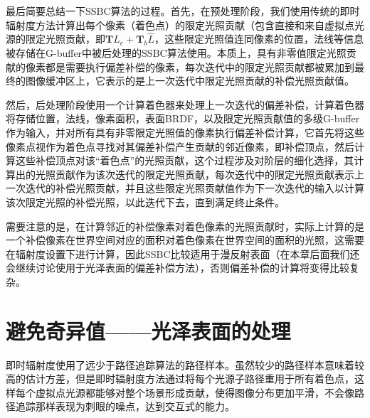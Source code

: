 最后简要总结一下SSBC算法的过程。首先，在预处理阶段，我们使用传统的即时辐射度方法计算出每个像素（着色点）的限定光照贡献（包含直接和来自虚拟点光源的限定光照贡献，即$\mathbf{T}L_e+\mathbf{T}_b\hat{L}$，这些限定光照值连同像素的位置，法线等信息被存储在G-buffer中被后处理的SSBC算法使用。本质上，具有非零值限定光照贡献的像素都是需要执行偏差补偿的像素，每次迭代中的限定光照贡献都被累加到最终的图像缓冲区上，它表示的是上一次迭代中限定光照贡献的补偿光照贡献值。

然后，后处理阶段使用一个计算着色器来处理上一次迭代的偏差补偿，计算着色器将存储位置，法线，像素面积，表面BRDF，以及限定光照贡献值的多级G-buffer作为输入，并对所有具有非零限定光照值的像素执行偏差补偿计算，它首先将这些像素点视作为着色点寻找对其偏差补偿产生贡献的邻近像素，即补偿顶点，然后计算这些补偿顶点对该“着色点”的光照贡献，这个过程涉及对阶层的细化选择，其计算出的光照贡献作为该次迭代的限定光照贡献，每次迭代中的限定光照贡献表示上一次迭代的补偿光照贡献，并且这些限定光照贡献值作为下一次迭代的输入以计算该次限定光照的补偿光照，以此迭代下去，直到满足终止条件。

需要注意的是，在计算邻近的补偿像素对着色像素的光照贡献时，实际上计算的是一个补偿像素在世界空间对应的面积对着色像素在世界空间的面积的光照，这需要在辐射度设置下进行计算，因此SSBC比较适用于漫反射表面（在本章后面我们还会继续讨论使用于光泽表面的偏差补偿方法），否则偏差补偿的计算将变得比较复杂。




\section{避免奇异值——光泽表面的处理}
即时辐射度使用了远少于路径追踪算法的路径样本。虽然较少的路径样本意味着较高的估计方差，但是即时辐射度方法通过将每个光源子路径重用于所有着色点，这样每个虚拟点光源都能够对整个场景形成贡献，使得图像分布更加平滑，不会像路径追踪那样表现为刺眼的噪点，达到交互式的能力。

